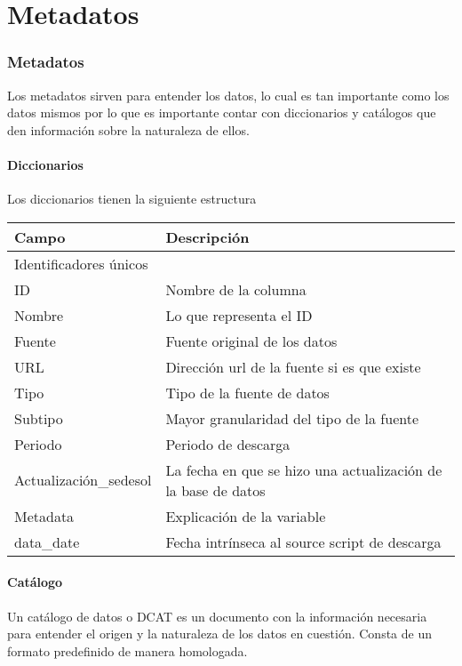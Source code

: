 \chapter{Metadatos}
\subsection{Metadatos}
Los metadatos sirven para entender los datos, lo cual es tan importante como los datos mismos por lo que es importante contar con diccionarios y catálogos que den información sobre la naturaleza de ellos.
\subsubsection{Diccionarios}
Los diccionarios tienen la siguiente estructura

\begin{longtable}{|p{8cm}|p{8cm}|}
    \hline
    \hline
    Campo  & Descripción\\
    \hline
    \multicolumn{2}{l}{Identificadores únicos}\\
    \hline
    ID & Nombre de la columna \\
    \hline
    Nombre & Lo que representa el ID \\
    \hline
    Fuente & Fuente original de los datos \\
    \hline
    URL & Dirección url de la fuente si es que existe \\
    \hline
    Tipo & Tipo de la fuente de datos \\
    \hline
    Subtipo & Mayor granularidad del tipo de la fuente \\
    \hline
    Periodo & Periodo de descarga \\
    \hline
    Actualización\_sedesol & La fecha en que se hizo una actualización de la base de datos\\
    \hline
    Metadata & Explicación de la variable \\
    \hline
    data\_date & Fecha intrínseca al source script de descarga \\
    \hline
\end{longtable}
\caption{Diccionario de datos}
\label{tab:diccionario}

\subsubsection{Catálogo}
Un catálogo de datos o DCAT es un documento con la información necesaria para entender el origen y la naturaleza de los datos en cuestión. Consta de un formato predefinido de manera homologada.
